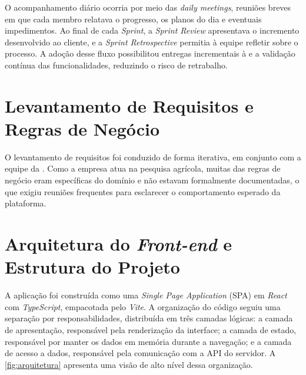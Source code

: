 O acompanhamento diário ocorria por meio das \textit{daily meetings}, reuniões breves em que cada membro relatava o progresso, os planos do dia e eventuais impedimentos. Ao final de cada \textit{Sprint}, a \textit{Sprint Review} apresentava o incremento desenvolvido ao cliente, e a \textit{Sprint Retrospective} permitia à equipe refletir sobre o processo. A adoção desse fluxo possibilitou entregas incrementais à  e a validação contínua das funcionalidades, reduzindo o risco de retrabalho.

\section{Levantamento de Requisitos e Regras de Negócio}

O levantamento de requisitos foi conduzido de forma iterativa, em conjunto com a equipe da . Como a empresa atua na pesquisa agrícola, muitas das regras de negócio eram específicas do domínio e não estavam formalmente documentadas, o que exigiu reuniões frequentes para esclarecer o comportamento esperado da plataforma.


\section{Arquitetura do \textit{Front-end} e Estrutura do Projeto}

A aplicação foi construída como uma \textit{Single Page Application} (SPA) em \textit{React} com \textit{TypeScript}, empacotada pelo \textit{Vite}. A organização do código seguiu uma separação por responsabilidades, distribuída em três camadas lógicas: a camada de apresentação, responsável pela renderização da interface; a camada de estado, responsável por manter os dados em memória durante a navegação; e a camada de acesso a dados, responsável pela comunicação com a API do servidor. A \autoref{fig:arquitetura} apresenta uma visão de alto nível dessa organização.

